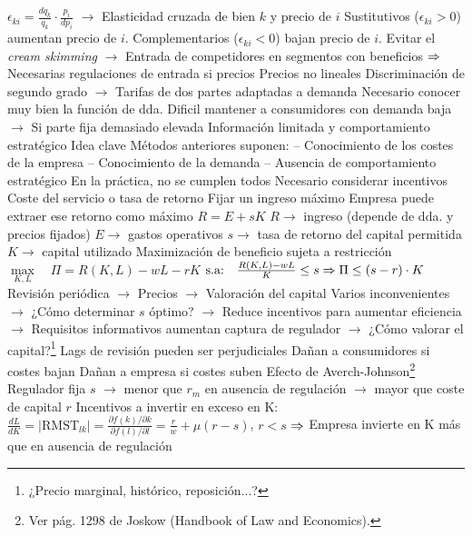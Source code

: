 \documentclass{nuevotema}
\begin{document}
\begin{esquemal}
				\4[] $\epsilon_{ki} = \frac{d q_k}{q_k} \cdot \frac{p_i}{d p_i}$
				\4[] $\to$ Elasticidad cruzada de bien $k$ y precio de $i$
				\4[$\then$] Sustitutivos ($\epsilon_{ki} > 0$) aumentan precio de $i$.
				\4[$\then$] Complementarios ($\epsilon_{ki} <0$) bajan precio de $i$.
				\4[] Evitar el \textit{cream skimming}
				\4[] $\to$ Entrada de competidores en segmentos con beneficios
				\4[] $\then$ Necesarias regulaciones de entrada si precios
			\3 Precios no lineales
				\4 Discriminación de segundo grado
				\4[] $\to$ Tarifas de dos partes adaptadas a demanda
				\4 Necesario conocer muy bien la función de dda.
				\4 Dificil mantener a consumidores con demanda baja
				\4[] $\to$ Si parte fija demasiado elevada
		\2 Información limitada y comportamiento estratégico
			\3 Idea clave
				\4 Métodos anteriores suponen:
				\4[] -- Conocimiento de los costes de la empresa
				\4[] -- Conocimiento de la demanda
				\4[] -- Ausencia de comportamiento estratégico
				\4 En la práctica, no se cumplen todos
				\4[] Necesario considerar incentivos
			\3 Coste del servicio o tasa de retorno
				\4 Fijar un ingreso máximo
				\4[] Empresa puede extraer ese retorno como máximo
				\4 $R = E + sK$
				\4[] $R \to$ ingreso (depende de dda. y precios fijados)
				\4[] $E \to$ gastos operativos
				\4[] $s \to$ tasa de retorno del capital permitida
				\4[] $K \to$ capital utilizado
				\4 Maximización de beneficio sujeta a restricción
				\4[] $\underset{K,L}{\max} \quad \Pi = R(K,L) - wL - rK$
				\4[] $\text{s.a:} \quad \frac{R(K,L) - wL}{K} \leq s \Rightarrow \Pi \leq (s-r) \cdot K$
				\4 Revisión periódica
				\4[] $\to$ Precios
				\4[] $\to$ Valoración del capital
				\4 Varios inconvenientes
				\4[] $\to$ ¿Cómo determinar $s$ óptimo?
				\4[] $\to$ Reduce incentivos para aumentar eficiencia
				\4[] $\to$ Requisitos informativos aumentan captura de regulador
				\4[] $\to$ ¿Cómo valorar el capital?\footnote{¿Precio marginal, histórico, reposición...?}
				\4[$\to$] Lags de revisión pueden ser perjudiciales
				\4[] Dañan a consumidores si costes bajan
				\4[] Dañan a empresa si costes suben
				\4[$\to$] Efecto de Averch-Johnson\footnote{Ver pág. 1298 de Joskow (Handbook of Law and Economics).}
				\4[] Regulador fija $s$
				\4[] $\to$ menor que $r_m$ en ausencia de regulación
				\4[] $\to$ mayor que coste de capital $r$
				\4[] Incentivos a invertir en exceso en K:
				\4[] $\frac{d L}{d K} = \left| \text{RMST}_{lk} \right| = \frac{ \partial f(k) / \partial k}{\partial f(l) / \partial l} = \frac{r}{w} + \mu(r-s)$, $r < s$
				\4[] $\then$ Empresa invierte en K más que en ausencia de regulación

\end{esquemal}
\end{document}
